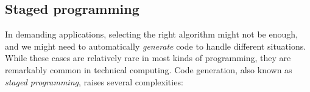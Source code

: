 







\subsection{Staged programming}

In demanding applications, selecting the right algorithm might not
be enough, and we might need to automatically \emph{generate} code
to handle different situations.
While these cases are relatively rare in most kinds of programming,
they are remarkably common in technical computing.
Code generation, also known as \emph{staged programming}, raises
several complexities:

